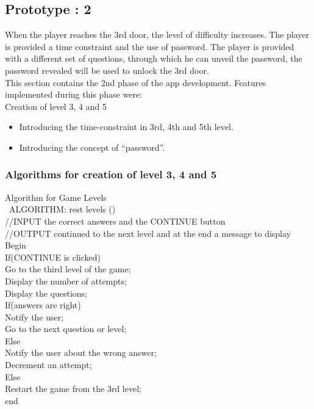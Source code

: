 \subsection{Prototype : 2}
\hspace{1cm}When the player reaches the 3rd door, the level of difficulty increases. The player is provided a time constraint and the use of password. The player is provided with a different set of questions, through which he can unveil the password, the password revealed will be used to unlock the 3rd door.\\
This section contains the 2nd phase of the app development. Features implemented during this phase were:\\
Creation of level 3, 4 and 5
\begin{itemize}
\item \textbf {}Introducing the time-constraint in 3rd, 4th and 5th level.
\item \textbf {}Introducing the concept of “password”.
\end{itemize}
\subsubsection{Algorithms for creation of level 3, 4 and 5 }
\hspace{1cm}Algorithm for Game Levels\\ 
\rmfamily\ 
ALGORITHM: rest levels ()\\
//INPUT the correct answers and the CONTINUE button\\
//OUTPUT continued to the next level and at the end a message to display\\
Begin\\
If(CONTINUE is clicked)\\
Go to the third level of the game;\\
Display the number of attempts;\\
Display the questions;\\
If(answers are right)\\
Notify the user;\\
Go to the next question or level;\\
Else\\
Notify the user about the wrong answer;\\
Decrement an attempt;\\
Else\\
Restart the game from the 3rd level;\\
end
\rmfamily

